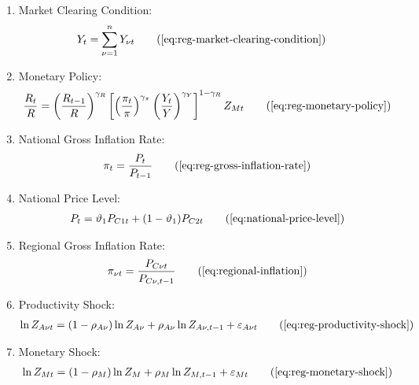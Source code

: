 \documentclass[
	thesis.tex
	]{subfiles}
\begin{document}
{\begin{itemize}
\begin{enumerate}
			\item Market Clearing Condition:
			\begin{align}
				Y_t &= \sum_{\nu=1}^{n} Y_{\nu t} \tag{\ref{eq:reg-market-clearing-condition}}
			\end{align}
			
			\item Monetary Policy:
			\begin{align}
				\frac{R_t}{R} = \left( 
				\frac{R_{t-1}}{R} \right)^{\gamma_R} \left[ \left(
				\frac{\pi_t}{\pi} \right)^{\gamma_\pi} \left( 
				\frac{Y_t}{Y} \right)^{\gamma_Y} \right]^{1-\gamma_R} Z_{Mt}
				\tag{\ref{eq:reg-monetary-policy}}
			\end{align}
			
			\item National Gross Inflation Rate:
			\begin{align}
				\pi_t = \frac{P_t}{P_{t-1}}
				\tag{\ref{eq:reg-gross-inflation-rate}}
			\end{align}

			\item National Price Level:
			\begin{align}
				P_t = \vartheta_1 P_{C1 t} + (1 -\vartheta_1) P_{C2 t}
				\tag{\ref{eq:national-price-level}}
			\end{align}

			\item Regional Gross Inflation Rate:
			\begin{align}
				\pi_{\nu t} = \frac{P_{C\nu t}}{P_{C\nu, t-1}} \tag{\ref{eq:regional-inflation}}
			\end{align}
			
			\item Productivity Shock:
			\begin{align}
				\ln{Z_{A\nu t}} = (1-\rho_{A\nu})\ln{Z_{A\nu}} + \rho_{A\nu}\ln{Z_{A\nu,t-1}} + \varepsilon_{A\nu t}
				\tag{\ref{eq:reg-productivity-shock}}
			\end{align}
			
			\item Monetary Shock:
			\begin{align}
				\ln{Z_{Mt}} = (1-\rho_M)\ln{Z_{M}} + \rho_M\ln{Z_{M,t-1}} + \varepsilon_{Mt}
				\tag{\ref{eq:reg-monetary-shock}}
			\end{align}
			
		\end{enumerate}
		
	\end{itemize}
	
} %
\end{document}
